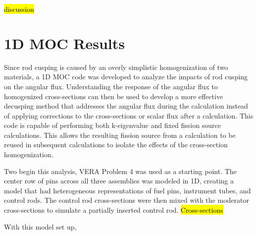 \begin{table}
\centering
\caption{VERA Problem 4 Decusping Results}\label{t:p5decusp}
\end{table}

\hl{discussion}

\section{1D MOC Results}

Since rod cusping is caused by an overly simplistic homogenization of two materials, a 1D MOC code was developed to analyze the impacts of rod cusping on the angular flux.  Understanding the response of the angular flux to homogenized cross-sections can then be used to develop a more effective decusping method that addresses the angular flux during the calculation instead of applying corrections to the cross-sections or scalar flux after a calculation.  This code is capable of performing both k-eigenvalue and fixed fission source calculations.  This allows the resulting fission source from a calculation to be reused in subsequent calculations to isolate the effects of the cross-section homogenization.

Two begin this analysis, VERA Problem 4 was used as a starting point.  The center row of pins across all three assemblies was modeled in 1D, creating a model that had heterogeneous representations of fuel pins, instrument tubes, and control rods.  The control rod cross-sections were then mixed with the moderator cross-sections to simulate a partially inserted control rod.  \hl{Cross-sections}

With this model set up, 